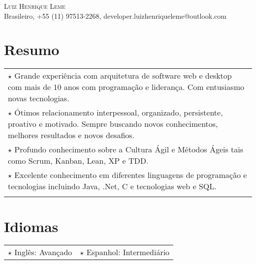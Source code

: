 \documentclass[a4paper, oneside, final]{scrartcl}
\newcommand{\vspc}{\vspace{0.15cm}} %
\begin{document}
\begin{center}
\textsc{\Huge{Luiz Henrique Leme}} \vspc\\
{\small Brasileiro, +55 (11) 97513-2268, developer.luizhenriqueleme@outlook.com}

\section{Resumo}
\begin{tabularx}{1\linewidth}{X}
	$\star$ Grande experiência com arquitetura de software web e desktop com mais de 10 anos com programação e liderança. Com entusiasmo novas tecnologias. \vspc\\
	
	$\star$ Ótimos relacionamento interpessoal, organizado, persistente, proativo e motivado. Sempre buscando novos conhecimentos, melhores resultados e novos desafios. \vspc\\
	
	$\star$ Profundo conhecimento sobre a Cultura Ágil e Métodos Ágeis tais como Scrum, Kanban, Lean, XP e TDD. \vspc\\
	
	$\star$ Excelente conhecimento em diferentes linguagens de programação e tecnologias incluindo Java, .Net, C e tecnologias web e SQL. \vspc\\
	
    \vspc\\	
\end{tabularx}

\section{Idiomas}
\begin{tabularx}{1\linewidth}{p{5cm}X}
$\star$ Inglês: Avançado & $\star$ Espanhol: Intermediário\\ 
\end{tabularx}



\end{center}
\end{document}
